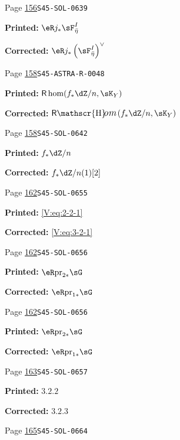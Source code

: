 \documentclass[oneside]{book}
\providecommand\calligra{\itshape}}
\DeclareMathOperator{\rHom}{\mathsf{R}\vspace{-1pt}\mathscr{H}\text{\kern -3pt {\calligra\large om}}\,}
\DeclareMathOperator{\rhom}{\mathsf{R}\hom}
\newcommand{\pr}{\mathrm{pr}} %
\theoremstyle{sga-source}
\theoremstyle{sga-source-dash}
\theoremstyle{sga-source-dotdash}
\theoremstyle{sga-source-number-note-dash}
\theoremstyle{sga-source-note-number-dotdash}
\theoremstyle{sga-source-example-dotdash}
\theoremstyle{sga-source-inline-number}
\theoremstyle{sga-source-bare-number}
\theoremstyle{sga-source}
\begin{document}
\begin{description}
\smallskip
\item[\hypertarget{apparatus:EN-0091}{91}] Page \hyperlink{printpage:en:156}{156}\quad\texttt{S45-SOL-0639}
\par\noindent\textbf{Printed:} \(\eR j_\ast \sF_{\bar\eta}^I\)
\par\noindent\textbf{Corrected:} \(\eR j_\ast\left(\sF_{\bar\eta}^I\right)^\vee\)
\smallskip
\item[\hypertarget{apparatus:EN-0092}{92}] Page \hyperlink{printpage:en:158}{158}\quad\texttt{S45-ASTRA-R-0048}
\par\noindent\textbf{Printed:} \(\rhom(f_\ast\dZ/n,\sK_Y)\)
\par\noindent\textbf{Corrected:} \(\rHom(f_\ast\dZ/n,\sK_Y)\)
\smallskip
\item[\hypertarget{apparatus:EN-0093}{93}] Page \hyperlink{printpage:en:158}{158}\quad\texttt{S45-SOL-0642}
\par\noindent\textbf{Printed:} \(f_\ast\dZ/n\)
\par\noindent\textbf{Corrected:} \(f_\ast\dZ/n(1)[2]\)
\smallskip
\item[\hypertarget{apparatus:EN-0094}{94}] Page \hyperlink{printpage:en:162}{162}\quad\texttt{S45-SOL-0655}
\par\noindent\textbf{Printed:} \eqref{V:eq:2-2-1}
\par\noindent\textbf{Corrected:} \eqref{V:eq:3-2-1}
\smallskip
\item[\hypertarget{apparatus:EN-0095}{95}] Page \hyperlink{printpage:en:162}{162}\quad\texttt{S45-SOL-0656}
\par\noindent\textbf{Printed:} \(\eR \pr_{2\ast}\sG\)
\par\noindent\textbf{Corrected:} \(\eR \pr_{1\ast}\sG\)
\smallskip
\item[\hypertarget{apparatus:EN-0096}{96}] Page \hyperlink{printpage:en:162}{162}\quad\texttt{S45-SOL-0656}
\par\noindent\textbf{Printed:} \(\eR \pr_{2\ast}\sG\)
\par\noindent\textbf{Corrected:} \(\eR \pr_{1\ast}\sG\)
\smallskip
\item[\hypertarget{apparatus:EN-0097}{97}] Page \hyperlink{printpage:en:163}{163}\quad\texttt{S45-SOL-0657}
\par\noindent\textbf{Printed:} \(3.2.2\)
\par\noindent\textbf{Corrected:} \(3.2.3\)
\smallskip
\item[\hypertarget{apparatus:EN-0098}{98}] Page \hyperlink{printpage:en:165}{165}\quad\texttt{S45-SOL-0664}

\end{description}
\end{document}
